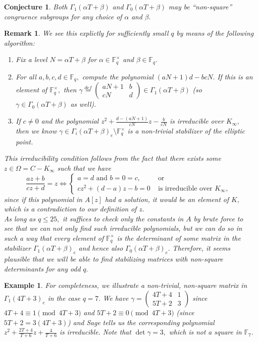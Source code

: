 \documentclass[11pt]{amsart}
\newtheorem{conjecture}[theorem]{Conjecture}
\newtheorem{example}[theorem]{Example}
\newtheorem{remark}[theorem]{Remark}
\theoremstyle{definition}
\numberwithin{equation}{section}
\newcommand{\cN}{\mathcal{N}}		%
\newcommand{\bbF}{\mathbb{F}}		%
\begin{document}
\begin{conjecture}	
		Both $\Gamma_1(\alpha T+\beta)$ and $\Gamma_0(\alpha T+\beta)$ may be ``non-square'' congruence subgroups for any choice of $\alpha$ and $\beta.$ 
\end{conjecture}
\begin{remark}
	We see this explictly for sufficiently small $q$ by means of the following algorithm:
	\begin{enumerate}
		\item Fix a level $N=\alpha T+\beta$ for $\alpha\in \bbF_q^{\times}$ and $\beta\in \bbF_q.$
		\item For all $a,b,c,d\in \bbF_q,$ compute the polynomial $(aN+1)d-bcN.$ If this is an element of $\bbF_q^{\times},$ then $\displaystyle{\gamma\overset{def}{=}\left(\begin{array}{cc} aN+1&b\\cN&d\end{array}\right)\in \Gamma_1(\alpha T+\beta)}$ (so $\gamma\in \Gamma_0(\alpha T+\beta)$ as well).
		\item If $c\neq 0$ and the polynomial $\displaystyle{z^2+\frac{d-(aN+1)}{cN}z-\frac{b}{cN}}$ is irreducible over $K_{\infty},$ then we know $\gamma\in \Gamma_i(\alpha T+\beta)_e\setminus \bbF_q^{\times}$ is a non-trivial stabilizer of the elliptic point. 
	\end{enumerate}
	This irreducibility condition follows from the fact that there exists some $z\in \Omega = C-K_{\infty}$ such that we have 
	\[\frac{az+b}{cz+d}=z \iff \begin{cases}
	a=d \text{ and } b=0=c, &\text{ or }\\
	cz^2+(d-a)z-b=0 & \text{ is irreducible over }K_{\infty},
	\end{cases}\] since if this polynomial in $A[z]$ had a solution, it would be an element of $K,$ which is a contradiction to our definition of $z.$\\
	
	As long as $q\leq 25,$ it suffices to check only the constants in $A$ by brute force to see that we can not only find such irreducible polynomials, but we can do so in such a way that every element of $\bbF_q^{\times}$ is the determinant of some matrix in the stabilizer $\Gamma_1(\alpha T+\beta)_e$ and hence also $\Gamma_0(\alpha T+\beta)_e.$ Therefore, it seems plausible that we will be able to find stabilizing matrices with non-square determinants for any odd $q.$  
\end{remark}
\begin{example}
	For completeness, we illustrate a non-trivial, non-square matrix in $\Gamma_1(4T+3)_e$ in the case $q=7.$ We have $\displaystyle{\gamma=\left(\begin{array}{cc}4T+4&1\\5T+2&3\end{array}\right)}$ since $4T+4\equiv 1\pmod{4T+3}$ and $5T+2\equiv 0\pmod{4T+3}$ (since $5T+2=3(4T+3)$) and Sage tells us the corresponding polynomial $\displaystyle{z^2+\frac{2T+4}{T+6}z+\frac{4}{T+6}}$ is irreducible. Note that $\det\gamma = 3,$ which is not a square in $\bbF_7.$
\end{example}
\end{document}
